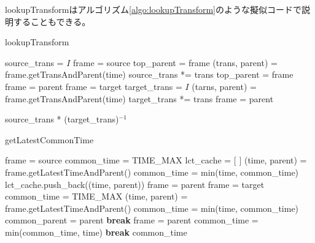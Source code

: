 \documentclass[a4paper]{jreport}	%
\begin{document}
lookupTransformはアルゴリズム\ref{algo:lookupTransform}のような擬似コードで説明することもできる。

\begin{algorithm}
\caption{lookupTransform} \label{algo:lookupTransform}
\begin{algorithmic}[1]
	 
	 
	\EndIf
	\State source\_trans = $I$ 
	\State frame = source
	\State top\_parent = frame
	\State (trans, parent) = frame.getTransAndParent(time) 
	\State source\_trans *= trans
	\State top\_parent = frame
	\State frame = parent
	\EndWhile
	\State frame = target
	\State target\_trans = $I$
	\State (tarns, parent) = frame.getTransAndParent(time)
	\State target\_trans *= trans
	\State frame = parent
	\EndWhile
	
	\Return source\_trans * (target\_trans)$^{-1}$
	\EndFunction
\end{algorithmic}
\end{algorithm}


\begin{algorithm}
\caption{getLatestCommonTime}
\begin{algorithmic}[1]
	 
	\State frame = source
	\State common\_time = TIME\_MAX
	\State lct\_cache = [ ] 
	\State (time, parent) = frame.getLatestTimeAndParent()
	\State common\_time = min(time, common\_time)
	\State lct\_cache.push\_back((time, parent))
	\State frame = parent
	\EndWhile
	\State frame = target
	\State common\_time = TIME\_MAX
	\State (time, parent) = frame.getLatestTimeAndParent()
	\State common\_time = min(time, common\_time)
	\State common\_parent = parent
	\State \textbf{break}
	\EndIf
	\State frame = parent
	\EndWhile
	\State common\_time = min(common\_time, time)
	\State \textbf{break}
	\EndIf
	\EndFor
	\Return common\_time
	\EndFunction
\end{algorithmic}
\end{algorithm}
\end{document}
